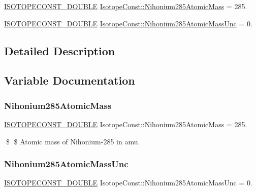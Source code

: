 \begin{DoxyCompactItemize}
\item 
\mbox{\hyperlink{group___isotope_const-_macros_ga8f45a7272ce02c0b4c65c44636ed719a}{I\+S\+O\+T\+O\+P\+E\+C\+O\+N\+S\+T\+\_\+\+D\+O\+U\+B\+LE}} \mbox{\hyperlink{group___isotope_const-_nihonium-_nh285_gaaeba49593cf5710739a17db022a905e5}{Isotope\+Const\+::\+Nihonium285\+Atomic\+Mass}} = 285.
\item 
\mbox{\hyperlink{group___isotope_const-_macros_ga8f45a7272ce02c0b4c65c44636ed719a}{I\+S\+O\+T\+O\+P\+E\+C\+O\+N\+S\+T\+\_\+\+D\+O\+U\+B\+LE}} \mbox{\hyperlink{group___isotope_const-_nihonium-_nh285_gad69ae7bc8b478c39dff0bf9f077ee27e}{Isotope\+Const\+::\+Nihonium285\+Atomic\+Mass\+Unc}} = 0.
\end{DoxyCompactItemize}


\subsection{Detailed Description}


\subsection{Variable Documentation}
\mbox{\label{group___isotope_const-_nihonium-_nh285_gaaeba49593cf5710739a17db022a905e5}} 
\subsubsection{\texorpdfstring{Nihonium285\+Atomic\+Mass}{Nihonium285AtomicMass}}
{\footnotesize\ttfamily \mbox{\hyperlink{group___isotope_const-_macros_ga8f45a7272ce02c0b4c65c44636ed719a}{I\+S\+O\+T\+O\+P\+E\+C\+O\+N\+S\+T\+\_\+\+D\+O\+U\+B\+LE}} Isotope\+Const\+::\+Nihonium285\+Atomic\+Mass = 285.}

\$ \$ Atomic mass of Nihonium-\/285 in amu. \mbox{\label{group___isotope_const-_nihonium-_nh285_gad69ae7bc8b478c39dff0bf9f077ee27e}} 
\subsubsection{\texorpdfstring{Nihonium285\+Atomic\+Mass\+Unc}{Nihonium285AtomicMassUnc}}
{\footnotesize\ttfamily \mbox{\hyperlink{group___isotope_const-_macros_ga8f45a7272ce02c0b4c65c44636ed719a}{I\+S\+O\+T\+O\+P\+E\+C\+O\+N\+S\+T\+\_\+\+D\+O\+U\+B\+LE}} Isotope\+Const\+::\+Nihonium285\+Atomic\+Mass\+Unc = 0.}

